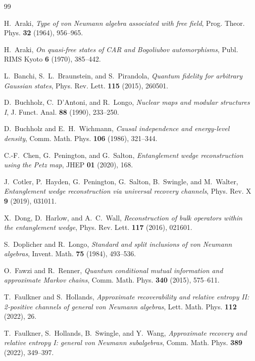 \documentclass[11pt,a4paper]{article}
\theoremstyle{plain}
\theoremstyle{definition}
\theoremstyle{remark}
\begin{document}
\begin{thebibliography}{99}

 H.~Araki, \emph{Type of von Neumann algebra associated with free
field}, Prog. Theor. Phys. \textbf{32} (1964), 956--965.

 H.~Araki, \emph{On quasi-free states of CAR and Bogoliubov
automorphisms}, Publ. RIMS Kyoto \textbf{6} (1970), 385--442.

 L.~Banchi, S.~L.~Braunstein, and S.~Pirandola, \emph{Quantum
fidelity for arbitrary Gaussian states}, Phys. Rev. Lett. \textbf{115} (2015),
260501.

 D.~Buchholz, C.~D'Antoni, and R.~Longo, \emph{Nuclear maps and
modular structures I}, J. Funct. Anal. \textbf{88} (1990), 233--250.

 D.~Buchholz and E.~H.~Wichmann, \emph{Causal independence and
energy-level density}, Comm. Math. Phys. \textbf{106} (1986), 321--344.

 C.-F.~Chen, G.~Penington, and G.~Salton, \emph{Entanglement
wedge reconstruction using the Petz map}, JHEP \textbf{01} (2020), 168.

 J.~Cotler, P.~Hayden, G.~Penington, G.~Salton, B.~Swingle,
and M.~Walter, \emph{Entanglement wedge reconstruction via universal recovery
channels}, Phys. Rev. X \textbf{9} (2019), 031011.

 X.~Dong, D.~Harlow, and A.~C.~Wall, \emph{Reconstruction of bulk
operators within the entanglement wedge}, Phys. Rev. Lett. \textbf{117} (2016),
021601.

 S.~Doplicher and R.~Longo, \emph{Standard and split
inclusions of von Neumann algebras}, Invent. Math. \textbf{75} (1984), 493--536.

 O.~Fawzi and R.~Renner, \emph{Quantum conditional mutual
information and approximate Markov chains}, Comm. Math. Phys. \textbf{340} (2015),
575--611.

 T.~Faulkner and S.~Hollands, \emph{Approximate recoverability and
relative entropy II: 2-positive channels of general von Neumann algebras}, Lett.
Math. Phys. \textbf{112} (2022), 26.

 T.~Faulkner, S.~Hollands, B.~Swingle, and Y.~Wang,
\emph{Approximate recovery and relative entropy I: general von Neumann
subalgebras}, Comm. Math. Phys. \textbf{389} (2022), 349--397.


\end{thebibliography}
\end{document}
